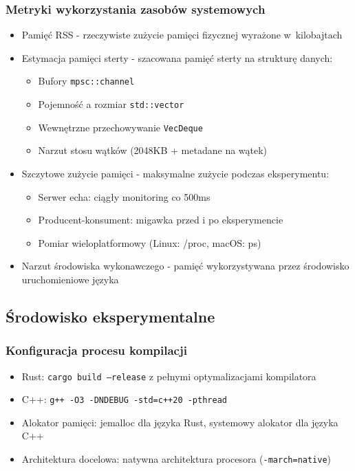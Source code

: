 \subsubsection{Metryki wykorzystania zasobów systemowych}
\begin{itemize}
    \item Pamięć RSS  - rzeczywiste zużycie pamięci fizycznej wyrażone w~kilobajtach
    \item Estymacja pamięci sterty - szacowana pamięć sterty na strukturę danych:
    \begin{itemize}
        \item Bufory \texttt{mpsc::channel}
        \item Pojemność a rozmiar \texttt{std::vector}
        \item Wewnętrzne przechowywanie \texttt{VecDeque}
        \item Narzut stosu wątków (2048KB + metadane na wątek)
    \end{itemize}
    \item Szczytowe zużycie pamięci - maksymalne zużycie podczas eksperymentu:
    \begin{itemize}
        \item Serwer echa: ciągły monitoring co 500ms
        \item Producent-konsument: migawka przed i po eksperymencie
        \item Pomiar wieloplatformowy (Linux: /proc, macOS: ps)
    \end{itemize}
    \item Narzut środowiska wykonawczego - pamięć wykorzystywana przez środowisko uruchomieniowe języka
\end{itemize}

\subsection{Środowisko eksperymentalne}

\subsubsection{Konfiguracja procesu kompilacji}
\begin{itemize}
    \item Rust: \texttt{cargo build --release} z pełnymi optymalizacjami kompilatora
    \item C++: \texttt{g++ -O3 -DNDEBUG -std=c++20 -pthread}
    \item Alokator pamięci: jemalloc dla języka Rust, systemowy alokator dla języka C++
    \item Architektura docelowa: natywna architektura procesora (\texttt{-march=native})
\end{itemize}

